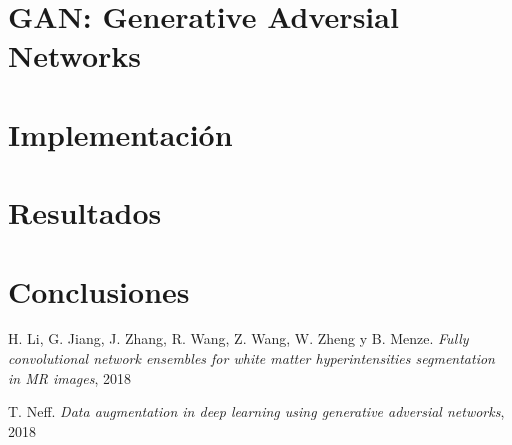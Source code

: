 \documentclass[12pt]{article}
\begin{document}
	\newpage
	
	\section{GAN: Generative Adversial Networks}
	
	\newpage
	
	\section{Implementación}
	
	\newpage
	
	\section{Resultados}
	
	\newpage
	
	\section{Conclusiones}
	
	\newpage
	
	\begin{thebibliography}{9}
	\raggedright
	
	H. Li, G. Jiang, J. Zhang, R. Wang, Z. Wang, W. Zheng y B. Menze. \textit{Fully convolutional network ensembles for white matter hyperintensities segmentation in MR images}, 2018
	
	T. Neff. \textit{Data augmentation in deep learning using generative adversial networks}, 2018

	\end{thebibliography}
	
\end{document}
